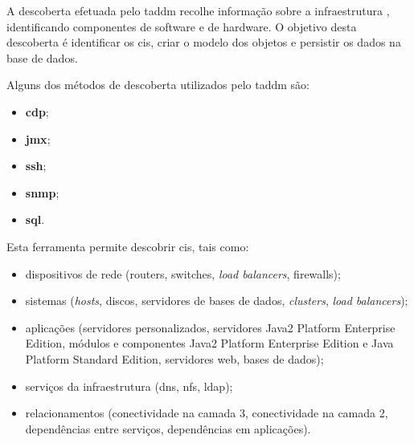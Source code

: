 \documentclass[
  oneside,
  11pt, a4paper,
  footinclude=true,
  headinclude=true,
  cleardoublepage=empty
]{scrbook}
\begin{document}



A descoberta efetuada pelo \gls{taddm} recolhe informação sobre a infraestrutura , identificando componentes de software e de hardware. O objetivo desta descoberta é identificar os \glspl{ci}, criar o modelo dos objetos e persistir os dados na base de dados.

Alguns dos métodos de descoberta utilizados pelo \gls{taddm} são:
\begin{itemize}
    \item \textbf{\gls{cdp}};
    \item \textbf{\gls{jmx}};
    \item \textbf{\gls{ssh}};
    \item \textbf{\gls{snmp}};
    \item \textbf{\gls{sql}}.
\end{itemize}

Esta ferramenta permite descobrir \glspl{ci}, tais como:
\begin{itemize}
    \item dispositivos de rede (routers, switches, \textit{load balancers}, firewalls);
    \item sistemas (\textit{hosts}, discos, servidores de bases de dados, \textit{clusters}, \textit{load balancers});
    \item aplicações (servidores personalizados, servidores Java2 Platform Enterprise Edition, módulos e componentes Java2 Platform Enterprise Edition e Java Platform Standard Edition, servidores web, bases de dados);
    \item serviços da infraestrutura (\gls{dns}, \gls{nfs}, \gls{ldap});
    \item relacionamentos (conectividade na camada 3, conectividade na camada 2, dependências entre serviços, dependências em aplicações).
\end{itemize}

\end{document}
